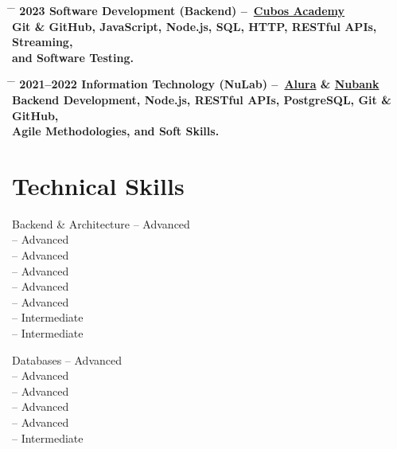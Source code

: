 \documentclass{article}
\begin{document}
\begin{tabbing}
  \hspace{2cm} \= \hspace{4cm} \= \kill
  \bf{2023} \> \textbf{Software Development (Backend)} –~\href{https://cubos.academy/}{Cubos Academy} \\
  \> Git \& GitHub, JavaScript, Node.js, SQL, HTTP, RESTful APIs, Streaming, \\
  \> and Software Testing. \\
\end{tabbing}

\begin{tabbing}
  \hspace{2cm} \= \hspace{4cm} \= \kill
  \bf{2021--2022} \> \textbf{Information Technology (NuLab)} –~\href{https://www.alura.com.br/}{Alura} \& \href{https://nubank.com.br/}{Nubank} \\
  \> Backend Development, Node.js, RESTful APIs, PostgreSQL, Git \& GitHub, \\
  \> Agile Methodologies, and Soft Skills. \\
\end{tabbing}

\section*{Technical Skills}

\begin{skillgroup}{Backend \& Architecture}%
   – Advanced \\
   – Advanced \\
   – Advanced \\
   – Advanced \\
   – Advanced \\
   – Advanced \\
   – Intermediate \\
   – Intermediate \\
\end{skillgroup}

\begin{skillgroup}{Databases}%
   – Advanced \\
   – Advanced \\
   – Advanced \\
   – Advanced \\
   – Advanced \\
   – Intermediate
\end{skillgroup}
\end{document}
